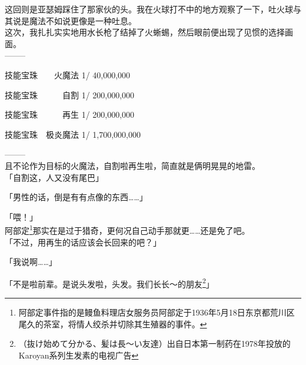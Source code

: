 这回则是亚瑟姆踩住了那家伙的头。我在火球打不中的地方观察了一下，吐火球与其说是魔法不如说更像是一种吐息。\\

这次，我扎扎实实地用水长枪了结掉了火蜥蜴，然后眼前便出现了见惯的选择画面。\\

  --------

  技能宝珠　　火魔法 1/    40,000,000

  技能宝珠　　　自割 1/   200,000,000

  技能宝珠　　　再生 1/   200,000,000

  技能宝珠　极炎魔法 1/ 1,700,000,000

  --------\\

且不论作为目标的火魔法，自割啦再生啦，简直就是俩明晃晃的地雷。\\

「自割这，人又没有尾巴」

「男性的话，倒是有有点像的东西……」

「喂！」\\

阿部定\footnote{阿部定事件指的是鳗鱼料理店女服务员阿部定于1936年5月18日东京都荒川区尾久的茶室，将情人绞杀并切除其生殖器的事件。}那实在是过于猎奇，更何况自己动手那就更……还是免了吧。\\

「不过，用再生的话应该会长回来的吧？」

「我说啊……」

「不是啦前辈。是说头发啦，头发。我们长长～的朋友\footnote{（抜け始めて分かる、髪は長～い友達）出自日本第一制药在1978年投放的Karoyan系列生发素的电视广告}」

